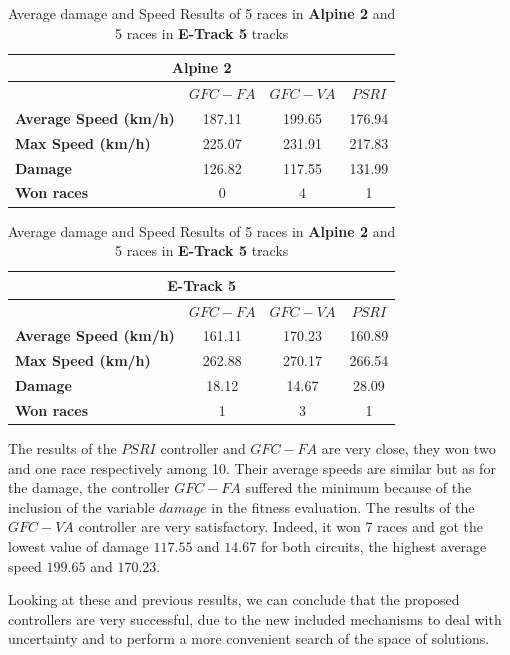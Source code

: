 \documentclass[conference]{IEEEtran}
\begin{document}
\begin{table}[!ht]
  \centering
  {\scriptsize
    \caption{Average damage and Speed Results of 5 races in
      \textbf{Alpine 2} and 5 races in \textbf{E-Track 5} tracks}
    \label{tab:damagespeed}
    \begin{tabular}{|p{1.65cm}|c|c|c|}
      \hline 
      \multicolumn{4}{|c|}{\textbf{Alpine 2}}  \\	
      \hline  
   & \textbf{$GFC-FA$}&\textbf{$GFC-VA$} & \textbf{$PSRI$}\\					
      \hline \textbf{Average Speed (km/h)}& 187.11&199.65&176.94\\
      \hline \textbf{Max Speed (km/h)}& 225.07&231.91&217.83\\	
      \hline \textbf{Damage}& 126.82& 117.55&131.99 \\	
      \hline \textbf{Won races}&0&4&1\\	
      
      \hline 
    \end{tabular}
    \begin{tabular}{|p{1.65cm}|c|c|c|}
      \multicolumn{4}{|c|}{\textbf{E-Track 5}}  \\
      \hline 
& \textbf{$GFC-FA$}&\textbf{$GFC-VA$} & \textbf{$PSRI$}\\				
      \hline \textbf{Average Speed (km/h)}& 161.11&170.23&160.89\\
      \hline \textbf{Max Speed  (km/h)}&262.88&270.17&266.54\\	
      \hline \textbf{Damage}&18.12& 14.67&28.09\\	 
      \hline \textbf{Won races}&1&3&1\\	
      \hline 
    \end{tabular}
	}
\end{table} 

The results of the $PSRI$ controller and $GFC-FA$ are very close, they won two and one race respectively among 10. Their average speeds are similar but as for the damage, the controller $GFC-FA$ suffered the minimum because of the inclusion of the variable $damage$ in the fitness evaluation.
The results of the $GFC-VA$ controller are very satisfactory. Indeed, it won 7 races and got the lowest value of damage $117.55$ and $14.67$ for both circuits, the highest average speed $199.65$ and $170.23$.

Looking at these and previous results, we can conclude that the proposed controllers are very successful, due to the new included mechanisms to deal with uncertainty and to perform a more convenient search of the space of solutions.
\end{document}
